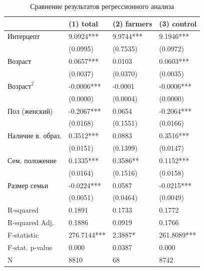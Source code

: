 \documentclass[14pt, a4paper]{article}
\begin{document}
	\begin{table}[H]
		\caption{Сравнение результатов регрессионного анализа}
		\label{tab:ols_compare}
		\begin{center}
			\begin{tabular}{llll}
			\toprule\toprule
			& (1) total  & (2) farmers & (3) control  \\
			\midrule
			Интерцепт        & 9.0924***  & 9.9744***   & 9.1946***    \\
			& (0.0995)   & (0.7535)    & (0.0972)     \\
			Возраст              & 0.0657***  & 0.0103      & 0.0603***    \\
			& (0.0037)   & (0.0370)    & (0.0035)     \\
			$\mathrm{Возраст}^{2}$     & -0.0006*** & -0.0001     & -0.0006***   \\
			& (0.0000)   & (0.0004)    & (0.0000)     \\
			Пол (женский)       & -0.2067*** & 0.0654      & -0.2064***   \\
			& (0.0168)   & (0.1551)    & (0.0166)     \\
			Наличие в. образ. & 0.3512***  & 0.0883      & 0.3516***    \\
			& (0.0151)   & (0.1399)    & (0.0147)     \\
			Сем. положение  & 0.1335***  & 0.3586**    & 0.1152***    \\
			& (0.0164)   & (0.1516)    & (0.0158)     \\
			Размер семьи     & -0.0224*** & 0.0587      & -0.0215***   \\
			& (0.0051)   & (0.0464)    & (0.0049)     \\
			\midrule
			R-squared        & 0.1891     & 0.1733      & 0.1772       \\
			R-squared Adj.   & 0.1886     & 0.0919      & 0.1766       \\
			F-statistic      & 276.7144***   & 2.3887*      & 261.8089***     \\
			F-stat. p-value    & 0.000   & 0.0387      & 0.000     \\
			N                & 8810       & 68          & 8742         \\
			\bottomrule
			\end{tabular}
		\end{center}
	\end{table}
	
\end{document}
